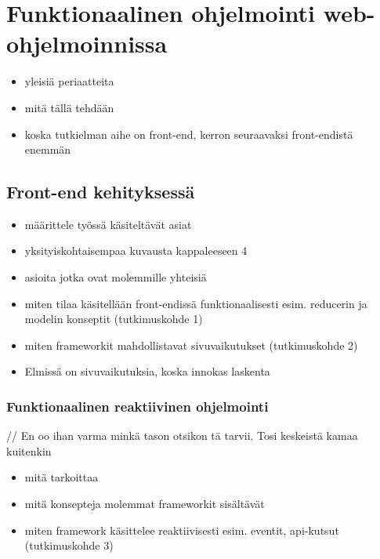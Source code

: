 \section{Funktionaalinen ohjelmointi web-ohjelmoinnissa}

\begin{itemize}
  \item yleisiä periaatteita
  \item mitä tällä tehdään
  \item koska tutkielman aihe on front-end, kerron seuraavaksi front-endistä enemmän
\end{itemize}

\subsection{Front-end kehityksessä}

\begin{itemize}
  \item määrittele työssä käsiteltävät asiat
  \item yksityiskohtaisempaa kuvausta kappaleeseen 4
  \item asioita jotka ovat molemmille yhteisiä
  \item miten tilaa käsitellään front-endissä funktionaalisesti esim. reducerin ja modelin konseptit (tutkimuskohde 1)
  \item miten frameworkit mahdollistavat sivuvaikutukset (tutkimuskohde 2)
  \item Elmissä on sivuvaikutuksia, koska innokas laskenta
\end{itemize}

\subsubsection{Funktionaalinen reaktiivinen ohjelmointi}

// En oo ihan varma minkä tason otsikon tä tarvii. Tosi keskeistä kamaa kuitenkin

\begin{itemize}
  \item mitä tarkoittaa
  \item mitä konsepteja molemmat frameworkit sisältävät
  \item miten framework käsittelee reaktiivisesti esim. eventit, api-kutsut (tutkimuskohde 3)
\end{itemize}
